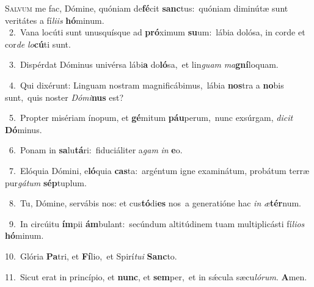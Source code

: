 \lettrine{\initial\textcolor{\initialcolor}{S}}{alvum} me fac, Dómine, quóniam de\-\textbf{fé}\-cit \textbf{sanc}\-tus:~\star quóniam diminútæ sunt veritátes a fí\-\textit{li}\-\textit{is} \textbf{hó}\-minum.\\
{\numbfont\textcolor{\numbcolor}{~2.}}~Vana locúti sunt unusquísque ad \textbf{pró}\-ximum \textbf{su}\-um:~\star lábia dolósa, in corde et cor\textit{de} \textit{lo}\-\textbf{cú}ti sunt.\par
{\numbfont\textcolor{\numbcolor}{~3.}}~Dispérdat Dóminus univérsa lábi\textbf{a} do\-\textbf{ló}\-sa,~\star et lin\textit{guam} \textit{ma}\-\textbf{gní}loquam.\par
{\numbfont\textcolor{\numbcolor}{~4.}}~Qui dixérunt: Linguam nostram magnificábimus,~\dagger lábia \textbf{nos}\-tra a \textbf{no}\-bis sunt,~\star quis noster \textit{Dó}\-\textit{mi}\textbf{nus} est?\par
{\numbfont\textcolor{\numbcolor}{~5.}}~Propter misériam ínopum, et \textbf{gé}\-mitum \textbf{páu}\-perum,~\star nunc exsúrgam, \textit{di}\-\textit{cit} \textbf{Dó}\-minus.\par
{\numbfont\textcolor{\numbcolor}{~6.}}~Ponam in \textbf{sa}\-lu\-\textbf{tá}\-ri:~\star fiduciáliter a\textit{gam} \textit{in} \textbf{e}\-o.\par
{\numbfont\textcolor{\numbcolor}{~7.}}~Elóquia Dómini, e\-\textbf{ló}\-quia \textbf{cas}\-ta:~\star argéntum igne examinátum, probátum terræ pur\-\textit{gá}\-\textit{tum} \textbf{sép}\-tuplum.\par
{\numbfont\textcolor{\numbcolor}{~8.}}~Tu, Dómine, servábis nos: et cus\-\textbf{tó}\-di\textbf{es} nos~\star a generatióne hac \textit{in} \textit{æ}\-\textbf{tér}num.\par
{\numbfont\textcolor{\numbcolor}{~9.}}~In circúitu \textbf{ím}\-pii \textbf{ám}\-bulant:~\star secúndum altitúdinem tuam multiplicásti fí\-\textit{li}\-\textit{os} \textbf{hó}\-minum.\par
{\numbfont\textcolor{\numbcolor}{10.}}~Glória \textbf{Pa}\-tri, et \textbf{Fí}\-lio,~\star et Spirí\-\textit{tu}\-\textit{i} \textbf{Sanc}\-to.\par
{\numbfont\textcolor{\numbcolor}{11.}}~Sicut erat in princípio, et \textbf{nunc}\-, et \textbf{sem}\-per,~\star et in sǽcula sæcu\-\textit{ló}\-\textit{rum}. \textbf{A}\-men.\par
